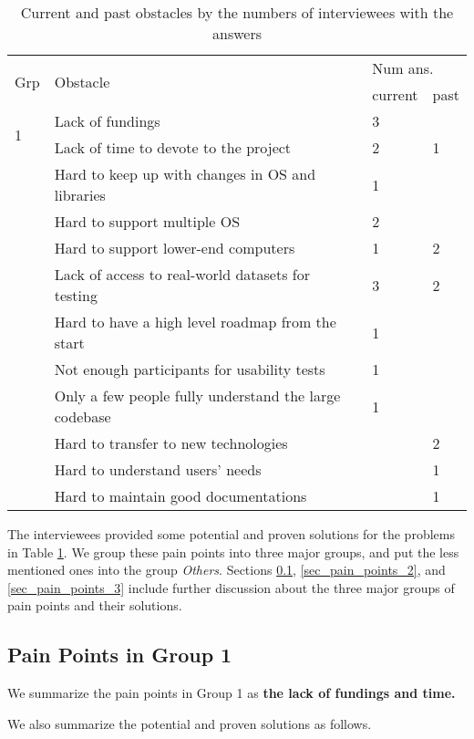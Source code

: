 \begin{table}[H]
\centering
\begin{tabular}{llll}
\hline
\multirow{2}{*}{Grp} & \multirow{2}{*}{Obstacle} & \multicolumn{2}{l}{Num ans.} \\ \cline{3-4} 
 &  & current & past \\ \hline
\multirow{2}{*}{1} & Lack of fundings & 3 &  \\
 & Lack of time to devote to the project & 2 & 1 \\ \hdashline
\multirow{3}{*}{2} & Hard to keep up with changes in OS and libraries & 1 &  \\
 & Hard to support multiple OS & 2 &  \\
 & Hard to support lower-end computers & 1 & 2 \\ \hdashline
3 & Lack of access to real-world datasets for testing & 3 & 2 \\ \hdashline
\multirow{7}{*}{Oths}
 & Hard to have a high level roadmap from the start & 1 &  \\
 & Not enough participants for usability tests & 1 &  \\
 & Only a few people fully understand the large codebase & 1 &  \\
 & Hard to transfer to new technologies & & 2 \\
 & Hard to understand users' needs & & 1 \\
 & Hard to maintain good documentations & & 1 \\ \hline
\end{tabular}
\caption{\label{tab_obstacles}Current and past obstacles by the numbers of interviewees with the answers}
\end{table}

The interviewees provided some potential and proven solutions for the problems in Table \ref{tab_obstacles}. We group these pain points into three major groups, and put the less mentioned ones into the group \textit{Others}. Sections \ref{sec_pain_points_1}, \ref{sec_pain_points_2}, and \ref{sec_pain_points_3} include further discussion about the three major groups of pain points and their solutions.

\subsection{Pain Points in Group 1}
\label{sec_pain_points_1}
We summarize the pain points in Group 1 as
\textbf{the lack of fundings and time.}

We also summarize the potential and proven solutions as follows.

